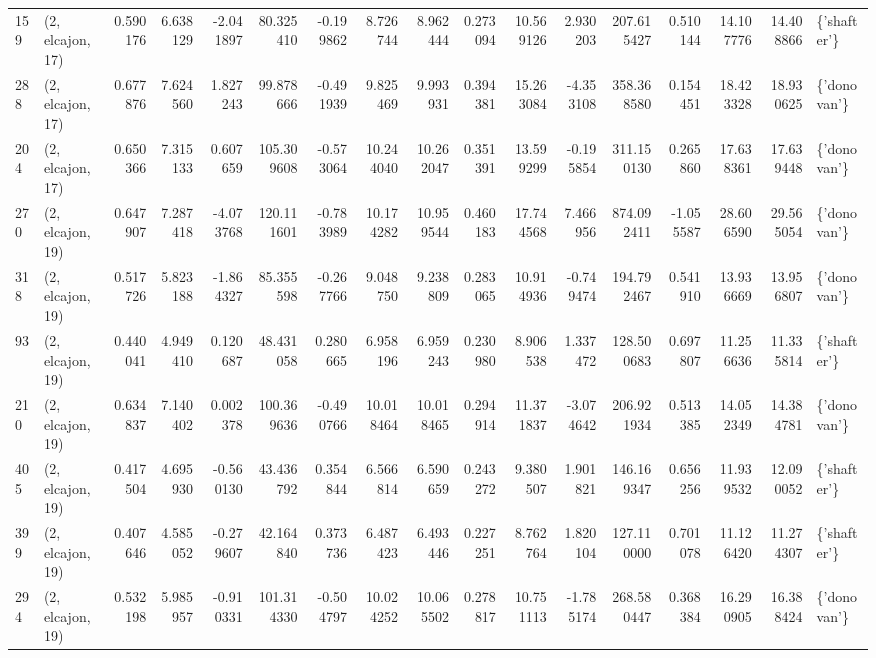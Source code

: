 \begin{tabular}{llrrrrrrrrrrrrrrl}
159 &  (2, elcajon, 17) &   0.590176 &   6.638129 &  -2.041897 &    80.325410 &  -0.199862 &   8.726744 &   8.962444 &  0.273094 &  10.569126 &   2.930203 &   207.615427 &   0.510144 &  14.107776 &  14.408866 &  \{'shafter'\} \\
288 &  (2, elcajon, 17) &   0.677876 &   7.624560 &   1.827243 &    99.878666 &  -0.491939 &   9.825469 &   9.993931 &  0.394381 &  15.263084 &  -4.353108 &   358.368580 &   0.154451 &  18.423328 &  18.930625 &  \{'donovan'\} \\
204 &  (2, elcajon, 17) &   0.650366 &   7.315133 &   0.607659 &   105.309608 &  -0.573064 &  10.244040 &  10.262047 &  0.351391 &  13.599299 &  -0.195854 &   311.150130 &   0.265860 &  17.638361 &  17.639448 &  \{'donovan'\} \\
270 &  (2, elcajon, 19) &   0.647907 &   7.287418 &  -4.073768 &   120.111601 &  -0.783989 &  10.174282 &  10.959544 &  0.460183 &  17.744568 &   7.466956 &   874.092411 &  -1.055587 &  28.606590 &  29.565054 &  \{'donovan'\} \\
318 &  (2, elcajon, 19) &   0.517726 &   5.823188 &  -1.864327 &    85.355598 &  -0.267766 &   9.048750 &   9.238809 &  0.283065 &  10.914936 &  -0.749474 &   194.792467 &   0.541910 &  13.936669 &  13.956807 &  \{'donovan'\} \\
93  &  (2, elcajon, 19) &   0.440041 &   4.949410 &   0.120687 &    48.431058 &   0.280665 &   6.958196 &   6.959243 &  0.230980 &   8.906538 &   1.337472 &   128.500683 &   0.697807 &  11.256636 &  11.335814 &  \{'shafter'\} \\
210 &  (2, elcajon, 19) &   0.634837 &   7.140402 &   0.002378 &   100.369636 &  -0.490766 &  10.018464 &  10.018465 &  0.294914 &  11.371837 &  -3.074642 &   206.921934 &   0.513385 &  14.052349 &  14.384781 &  \{'donovan'\} \\
405 &  (2, elcajon, 19) &   0.417504 &   4.695930 &  -0.560130 &    43.436792 &   0.354844 &   6.566814 &   6.590659 &  0.243272 &   9.380507 &   1.901821 &   146.169347 &   0.656256 &  11.939532 &  12.090052 &  \{'shafter'\} \\
399 &  (2, elcajon, 19) &   0.407646 &   4.585052 &  -0.279607 &    42.164840 &   0.373736 &   6.487423 &   6.493446 &  0.227251 &   8.762764 &   1.820104 &   127.110000 &   0.701078 &  11.126420 &  11.274307 &  \{'shafter'\} \\
294 &  (2, elcajon, 19) &   0.532198 &   5.985957 &  -0.910331 &   101.314330 &  -0.504797 &  10.024252 &  10.065502 &  0.278817 &  10.751113 &  -1.785174 &   268.580447 &   0.368384 &  16.290905 &  16.388424 &  \{'donovan'\} \\

\end{tabular}
